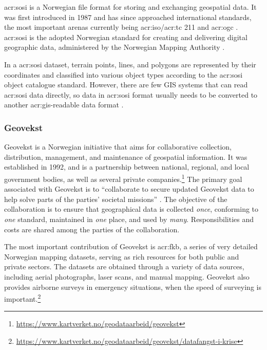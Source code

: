 \gls{acr:sosi} is a Norwegian file format for storing and exchanging geospatial data. It was first introduced in 1987 and has since approached international standards, the most important arenas currently being \acrshort{acr:iso}/\acrshort{acr:tc} 211 and \gls{acr:ogc} \citep{mardalNasjonalStrategiVidereutvikling2015}. \gls{acr:sosi} is the adopted Norwegian standard for creating and delivering digital geographic data, administered by the Norwegian Mapping Authority \citep{maehlumSOSI2023}.

In a \gls{acr:sosi} dataset, terrain points, lines, and polygons are represented by their coordinates and classified into various object types according to the \gls{acr:sosi} object catalogue standard. However, there are few GIS systems that can read \gls{acr:sosi} data directly, so data in \gls{acr:sosi} format usually needs to be converted to another \gls{acr:gis}-readable data format \citep{maehlumSOSI2023}.

\subsubsection{Geovekst}\label{subsubsec:geovekst}

Geovekst is a Norwegian initiative that aims for collaborative collection, distribution, management, and maintenance of geospatial information. It was established in 1992, and is a partnership between national, regional, and local government bodies, as well as several private companies.\footnote{\url{https://www.kartverket.no/geodataarbeid/geovekst}} The primary goal associated with Geovekst is to \enquote{collaborate to secure updated Geovekst data to help solve parts of the parties' societal missions} \citep[5]{thenorwegianmappingauthorityHandbokGeovekstsamarbeidet2023}. The objective of the collaboration is to ensure that geographical data is collected \textit{once}, conforming  to \textit{one} standard, maintained in \textit{one} place, and used by \textit{many}. Responsibilities and costs are shared among the parties of the collaboration.

The most important contribution of Geovekst is \gls{acr:fkb}, a series of very detailed Norwegian mapping datasets, serving as rich resources for both public and private sectors. The datasets are obtained through a variety of data sources, including aerial photographs, laser scans, and manual mapping. Geovekst also provides airborne surveys in emergency situations, when the speed of surveying is important.\footnote{\url{https://www.kartverket.no/geodataarbeid/geovekst/datafangst-i-krise}}

